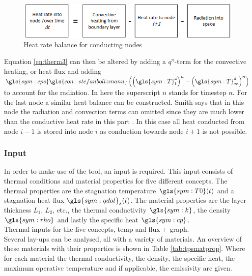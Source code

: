 \begin{figure}[H]
	\centering
	\includegraphics{Figure/thermblocknode2.png}
	\caption{Heat rate balance for conducting nodes}
	\label{fig:thermbalance2}
\end{figure}

Equation \eqref{eq:therm3} can then be altered by adding a $q^n$-term for the convective heating, or heat flux and adding  $\gls{sym:eps}\gls{con:stefanboltzmann}\left(\left(\gls{sym:T}_1^4\right)^n-\left(\gls{sym:T}_\infty^4\right)^n\right)$ to account for the radiation. In here the superscript $n$ stands for timestep $n$. For the last node a similar heat balance can be constructed. Smith says that in this node the radiation and convection terms can omitted since they are much lower than the conductive heat rate in this part \cite{Smith2011}. In this case all heat conducted from node $i-1$ is stored into node $i$ as conduction towards node $i+1$ is not possible.


\subsubsection{Input}
In order to make use of the tool, an input is required. This input consists of thermal conditions and material properties for five different concepts. The thermal properties are the stagnation temperature $ \gls{sym:T0}(t) $ and a stagnation heat flux $ \gls{sym:qdot}_s(t) $. The material properties are the layer thickness $ L_1 $, $ L_2 $, etc., the thermal conductivity $ \gls{sym:k} $, the density $ \gls{sym:rho} $ and lastly the specific heat $ \gls{sym:cp} $.\\

Thermal inputs for the five concepts, temp and flux + graph.\\

Several lay-ups can be analysed, all with a variety of materials. An overview of these materials with their properties is shown in Table  \ref{tab:tpsmatprop}. Where for each material the thermal conductivity, the density, the specific heat, the maximum operative temperature and if applicable, the emissivity are given.

